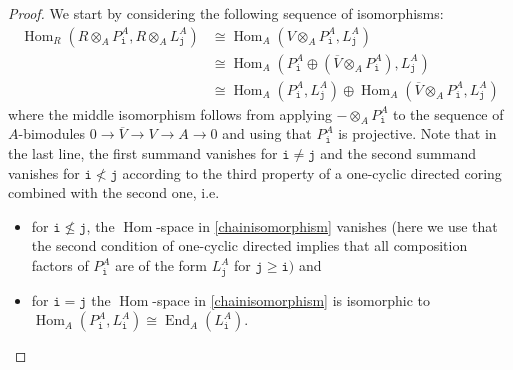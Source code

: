 \documentclass[12pt,a4paper]{amsart}
\theoremstyle{plain}
\theoremstyle{definition}
\numberwithin{equation}{thm}
\DeclareMathOperator{\Hom}{Hom}
\DeclareMathOperator{\End}{End}
\begin{document}
\begin{proof}
We start by considering the following sequence of isomorphisms: 
\begin{equation}\label{chainisomorphism}
\begin{aligned}
\Hom_R(R\otimes_A P_\mathtt{i}^A, R\otimes_A L_\mathtt{j}^A)&\cong\Hom_A(V\otimes_A P_\mathtt{i}^A, L_\mathtt{j}^A)\\
&\cong \Hom_A(P_\mathtt{i}^A\oplus (\overline{V}\otimes_A P_\mathtt{i}^A), L_\mathtt{j}^A)\\
&\cong \Hom_A(P_\mathtt{i}^A, L_\mathtt{j}^A)\oplus \Hom_A(\overline{V}\otimes_A P_\mathtt{i}^A, L_\mathtt{j}^A) 
\end{aligned}
\end{equation}
where the middle isomorphism follows from applying $-\otimes_A P_\mathtt{i}^A$ to the sequence of $A$-bimodules $0\to \overline{V}\to V\to A\to 0$ and using that $P_\mathtt{i}^A$ is projective. Note that in the last line, the first summand vanishes for $\mathtt{i}\neq \mathtt{j}$ and the second summand vanishes for $\mathtt{i}\nless \mathtt{j}$ according to the third property of a one-cyclic directed coring combined with the second one, i.e.
\begin{itemize} 
\item for $\mathtt{i}\nleq \mathtt{j}$, the $\Hom$-space in \eqref{chainisomorphism} vanishes (here we use that the second condition of one-cyclic directed implies that all composition factors of $P_\mathtt{i}^A$ are of the form $L_\mathtt{j}^A$ for $\mathtt{j}\geq \mathtt{i})$ and
\item for $\mathtt{i}=\mathtt{j}$ the $\Hom$-space in \eqref{chainisomorphism} is isomorphic to $\Hom_A(P_\mathtt{i}^A,L_\mathtt{i}^A)\cong \End_A(L_\mathtt{i}^A)$. 
\end{itemize}


\end{proof}
\end{document}
